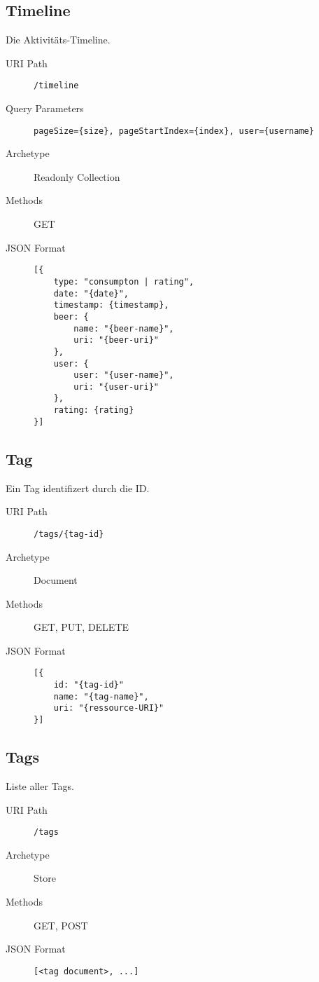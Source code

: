 \documentclass[10pt,a4paper]{scrartcl}
\begin{document}
\subsection{Timeline}

Die Aktivitäts-Timeline.

\begin{description}
 	\item[URI Path] \texttt{/timeline}
	\item[Query Parameters] \texttt{pageSize=\{size\}, pageStartIndex=\{index\}, user=\{username\}}
	\item[Archetype] Readonly Collection
	\item[Methods] GET
	\item[JSON Format] \hfill
\begin{lstlisting}
[{	
	type: "consumpton | rating",
	date: "{date}",
	timestamp: {timestamp},
	beer: {
		name: "{beer-name}",
		uri: "{beer-uri}"
	},
	user: {
		user: "{user-name}",
		uri: "{user-uri}"	
	},
	rating: {rating}
}]
\end{lstlisting}
\end{description}


\subsection{Tag}

Ein Tag identifizert durch die ID.

\begin{description}
	\item[URI Path] \texttt{/tags/\{tag-id\}}
	\item[Archetype] Document
	\item[Methods] GET, PUT, DELETE
	\item[JSON Format] \hfill
\begin{lstlisting}
[{	
	id: "{tag-id}"
	name: "{tag-name}",
	uri: "{ressource-URI}"
}]
\end{lstlisting}
\end{description}

\subsection{Tags}

Liste aller Tags.

\begin{description}
	\item[URI Path] \texttt{/tags}
	\item[Archetype] Store
	\item[Methods] GET, POST
	\item[JSON Format] \hfill
\begin{lstlisting}
[<tag document>, ...]
\end{lstlisting}
\end{description}




\end{document}
